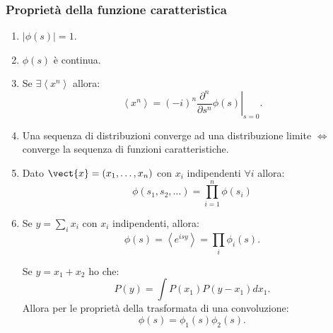 \subsubsection{Proprietà della funzione caratteristica}%
\label{ssub:Proprietà della funzione caratteristica}
\begin{enumerate}
    \item $\left|\phi (s) \right|= 1 $.
    \item $\phi (s) $ è continua.
    \item Se $\exists \left<x^n\right>$ allora: 
	\[
		\left<x^n\right> = \left(-i\right)^n \left.\frac{\partial ^n}{\partial s^n} \phi (s)\right|_{s=0} 
	.\] 
    \item Una sequenza di distribuzioni converge ad una distribuzione limite $\iff$ converge la sequenza di funzioni caratteristiche.
    \item Dato $\vect{x} = \left(x_1, \ldots, x_n\right)$ con $x_i$ indipendenti $\forall i$ allora:
	\[ 
	    \phi (s_1, s_2, \ldots) = \prod_{i=1}^{n} \phi (s_i)  
	\]
    \item Se $y = \sum_{i}^{} x_i$ con $x_i$ indipendenti, allora:
	\[
	    \phi (s) = \left<e^{isy}\right> = \prod_{i}^{} \phi_i(s)  
	.\] 
	\begin{exmp}
	    Se $y = x_1 + x_2$ ho che:
	    \[
		P(y) = \int P(x_1) P(y-x_1) dx_1
	    .\] 
	    Allora per le proprietà della trasformata di una convoluzione:
	    \[
		\phi (s) = \phi_1(s) \phi_2(s) 
	    .\] 
	\end{exmp}
\end{enumerate}
\clearpage
